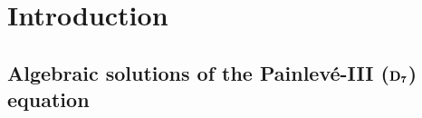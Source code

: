 \documentclass[pdftex]{sigma}
\numberwithin{equation}{section}
\begin{document}


\renewcommand{\thefootnote}{\arabic{footnote}}
\setcounter{footnote}{0}

\section{Introduction}

\subsection[Algebraic solutions of the Painlev\'e-III (D\_7) equation]{Algebraic solutions of the Painlev\'e-III ($\boldsymbol{{\rm D}_7}$) equation}
\end{document}
